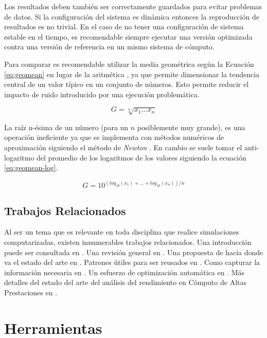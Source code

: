 \documentclass[a4paper]{report}
\begin{document}
Los resultados deben también ser correctamente guardados para evitar problemas de datos. Si la configuración del sistema es dinámica entonces la
reproducción de resultados es no trivial. En el caso de no tener una configuración de sistema estable en el tiempo, es recomendable siempre
ejecutar una versión optimizada contra una versión de referencia en un mismo sistema de cómputo.

\bigskip

Para comparar es recomendable utilizar la media geométrica según la Ecuación \ref{eq:geomean} en lugar de la aritmética \cite{how-not-to-lie}, ya que permite dimensionar la tendencia central de un valor típico en un conjunto de números. Esto permite reducir el impacto de ruido introducido por una ejecución problemática.

\begin{equation}
\label{eq:geomean}
G = \sqrt[n]{x_{1} \ldots x_{n}}
\end{equation}

La raíz n-ésima de un número (para un $ n $ posiblemente muy grande), es una operación ineficiente ya que se implementa con métodos numéricos de aproximación siguiendo el método de {\it Newton} \cite{numerical-analysis}. En cambio se suele tomar el anti-logaritmo del promedio de los logaritmos de los valores siguiendo la ecuación \ref{eq:geomean-log}.

\begin{equation}
\label{eq:geomean-log}
G = 10 ^{( log _{10} (x_{1}) + \ldots + log _{10} (x_{n}) ) / n}
\end{equation}

\subsection{Trabajos Relacionados}

Al ser un tema que es relevante en toda disciplina que realice simulaciones computarizadas, existen innumerables trabajos relacionados.
Una introducción puede ser consultada en \cite{intro}. Una revisión general en \cite{overview}. Una propuesta de hacia donde va el estado del arte en \cite{future}. Patrones útiles para ser reusados en \cite{patterns}. Como capturar la información necesaria en \cite{capturing}. Un esfuerzo de optimización automática en \cite{automatic}. Más detalles del estado del arte del análisis del rendimiento en Cómputo de Altas Prestaciones en \cite{hybrid}.

\section{Herramientas}
\end{document}
